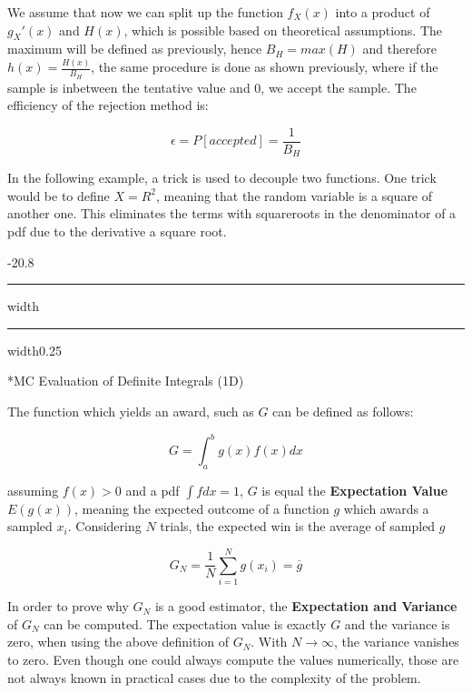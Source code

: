 \documentclass[8pt, landscape, fleqn]{scrartcl}
\makeatletter
\renewcommand{\subsection}{\@startsection{subsection}{1}{0mm}%
{-2\baselineskip}{0.8\baselineskip}%
{\hrule depth 0.2pt width\columnwidth\hrule depth0.75pt
width0.25\columnwidth\vspace*{1.2em}\large\bfseries\rmfamily}}
\makeatother
\begin{document}
\begin{multicols*}{3}


We assume that now we can split up the function $f_X(x)$ into a product of $g_X'(x)$ and $H(x)$, which is possible based on theoretical assumptions. The maximum will be defined as previously, hence $B_H = max(H)$ and therefore $h(x) = \frac{H(x)}{B_H}$, the same procedure is done as shown previously, where if the sample is inbetween the tentative value and 0, we accept the sample. The efficiency of the rejection method is:

\begin{equation}
    \epsilon = P[accepted] = \frac{1}{B_H}
\end{equation}

In the following example, a trick is used to decouple two functions. One trick would be to define $X = R^2$, meaning that the random variable is a square of another one. This eliminates the terms with squareroots in the denominator of a pdf due to the derivative a square root. 

\subsection*{MC Evaluation of Definite Integrals (1D)}

The function which yields an award, such as $G$ can be defined as follows:

\begin{equation}
    G = \int_a^b g(x) f(x) dx 
\end{equation}

assuming $f(x)>0$ and a pdf $\int f dx = 1$, $G$ is equal the \textbf{Expectation Value} $E(g(x))$, meaning the expected outcome of a function $g$ which awards a sampled $x_i$. Considering $N$ trials, the expected win is the average of sampled $g$

\begin{equation}
    G_N = \frac{1}{N} \sum_{i=1}^N g(x_i) = \overline{g}
\end{equation} 

In order to prove why $G_N$ is a good estimator, the \textbf{Expectation and Variance} of $G_N$ can be computed. The expectation value is exactly $G$ and the variance is zero, when using the above definition of $G_N$. With $N \rightarrow \infty$, the variance vanishes to zero. Even though one could always compute the values numerically, those are not always known in practical cases due to the complexity of the problem. \newline


\end{multicols*}
\end{document}
